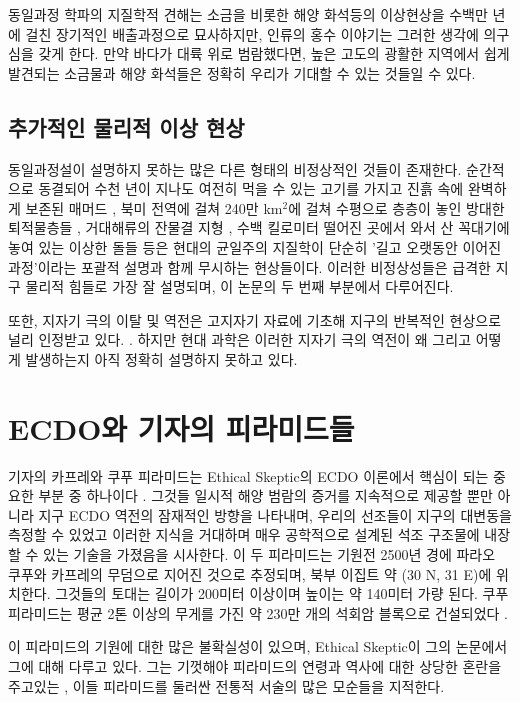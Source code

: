 \documentclass[10pt,twocolumn,letterpaper]{article}
\begin{document}
동일과정 학파의 지질학적 견해는 소금을 비롯한 해양 화석등의 이상현상을 수백만 년에 걸친 장기적인 배출과정으로 묘사하지만, 인류의 홍수 이야기는 그러한 생각에 의구심을 갖게 한다. 만약 바다가 대륙 위로 범람했다면, 높은 고도의 광활한 지역에서 쉽게 발견되는 소금물과 해양 화석들은 정확히 우리가 기대할 수 있는 것들일 수 있다.

\subsection{추가적인 물리적 이상 현상 }

동일과정설이 설명하지 못하는 많은 다른 형태의 비정상적인 것들이 존재한다. 순간적으로 동결되어 수천 년이 지나도 여전히 먹을 수 있는 고기를 가지고 진흙 속에 완벽하게 보존된 매머드 \cite{17,18,19}, 북미 전역에 걸쳐 240만 km$^2$에 걸쳐 수평으로 층층이 놓인 방대한 퇴적물층들  \cite{21}, 거대해류의 잔물결 지형 \cite{22}, 수백 킬로미터 떨어진 곳에서 와서 산 꼭대기에 놓여 있는 이상한 돌들  \cite{23,26} 등은 현대의 균일주의 지질학이 단순히 '길고 오랫동안 이어진 과정'이라는 포괄적 설명과 함께  무시하는 현상들이다. 이러한 비정상성들은 급격한 지구 물리적 힘들로 가장 잘 설명되며, 이 논문의 두 번째 부분에서 다루어진다.

또한, 지자기 극의 이탈 및 역전은 고지자기 자료에 기초해 지구의 반복적인 현상으로 널리 인정받고 있다. \cite{35,40,41}. 하지만 현대 과학은 이러한 지자기 극의 역전이 왜 그리고 어떻게 발생하는지 아직 정확히 설명하지 못하고 있다.

\section{ECDO와 기자의 피라미드들}
기자의 카프레와 쿠푸 피라미드는 Ethical Skeptic의 ECDO 이론에서 핵심이 되는 중요한 부분 중 하나이다 \cite{27}. 그것들 일시적 해양 범람의 증거를 지속적으로 제공할 뿐만 아니라 지구 ECDO 역전의 잠재적인 방향을 나타내며, 우리의 선조들이 지구의 대변동을 측정할 수 있었고 이러한 지식을 거대하며 매우 공학적으로 설계된 석조 구조물에 내장할 수 있는 기술을 가졌음을 시사한다. 이 두 피라미드는 기원전 2500년 경에 파라오 쿠푸와 카프레의 무덤으로 지어진 것으로 추정되며, 북부 이집트 약 (30 N, 31 E)에 위치한다. 그것들의 토대는 길이가 200미터 이상이며 높이는  약 140미터 가량 된다. 쿠푸 피라미드는 평균 2톤 이상의 무게를 가진 약 230만 개의 석회암 블록으로 건설되었다 \cite{24, 25}.

이 피라미드의 기원에 대한 많은 불확실성이 있으며, Ethical Skeptic이 그의 논문에서 그에 대해 다루고 있다. 그는 기껏해야 피라미드의 연령과 역사에 대한 상당한 혼란을 주고있는 , 이들 피라미드를 둘러싼 전통적 서술의 많은 모순들을 지적한다. 
\end{document}

